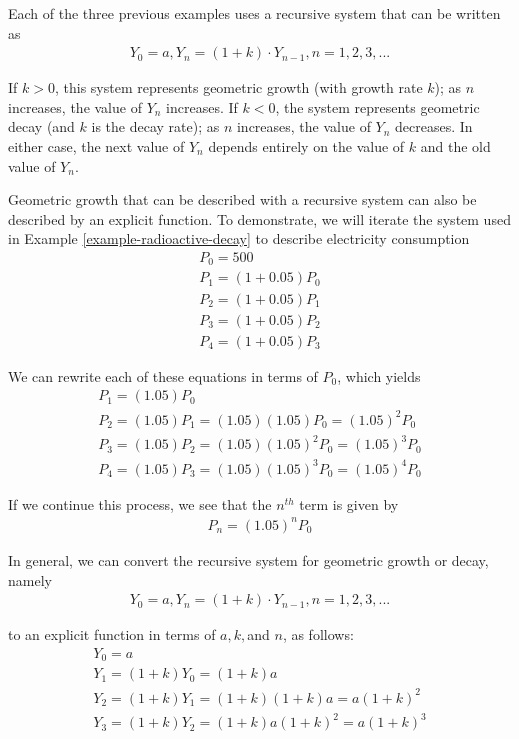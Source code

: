\documentclass[10pt,]{book}
\theoremstyle{plain}
\theoremstyle{definition}
\theoremstyle{definition}
\theoremstyle{definition}
\numberwithin{equation}{section}
\newcommand{\lt}{<}
\newcommand{\gt}{>}
\begin{document}
\par
Each of the three previous examples uses a recursive system that can be written as%
%
\begin{gather*}
Y_0=a,Y_n=(1+k) \cdot Y_{n-1}, n=1,2,3, ...
\end{gather*}
\par
If \(k \gt 0\), this system represents geometric growth (with growth rate \(k\)); as \(n\) increases, the value of \(Y_n\)  increases.  If \(k \lt 0\), the system represents geometric decay (and \(k\) is the decay rate); as \(n\) increases, the value of \(Y_n\)  decreases.  In either case, the next value of \(Y_n\) depends entirely on the value of \(k\) and the old value of \(Y_n\).%
\par
Geometric growth that can be described with a recursive system can also be described by an explicit function.  To demonstrate, we will iterate the system used in Example \hyperref[example-radioactive-decay]{\ref{example-radioactive-decay}} to describe electricity consumption%
%
\begin{gather*}
P_0=500\\
P_1=(1+0.05)P_0\\
P_2=(1+0.05)P_1\\
P_3=(1+0.05)P_2\\
P_4=(1+0.05)P_3
\end{gather*}
\par
We can rewrite each of these equations in terms of \(P_0\), which yields%
%
\begin{gather*}
P_1=(1.05)P_0\\
P_2=(1.05) P_1=(1.05) (1.05)P_0=(1.05)^2 P_0\\
P_3=(1.05) P_2=(1.05) (1.05)^2 P_0=(1.05)^3 P_0\\
P_4=(1.05) P_3=(1.05) (1.05)^3 P_0=(1.05)^4 P_0
\end{gather*}
\par
If we continue this process, we see that the \(n^{th}\) term is given by%
%
\begin{gather*}
P_n=(1.05)^n P_0
\end{gather*}
\par
In general, we can convert the recursive system for geometric growth or decay, namely%
%
\begin{gather*}
Y_0=a,Y_n=(1+k) \cdot Y_{n-1}, n=1,2,3, ...
\end{gather*}
\par
to an explicit function in terms of \(a, k, \)and \(n\), as follows:%
%
\begin{gather*}
Y_0=a\\
Y_1=(1+k)Y_0 = (1+k)a\\
Y_2=(1+k)Y_1 = (1+k)(1+k)a = a(1+k)^2\\
Y_3=(1+k)Y_2 = (1+k)a(1+k)^2 = a(1+k)^3
\end{gather*}
\end{document}
